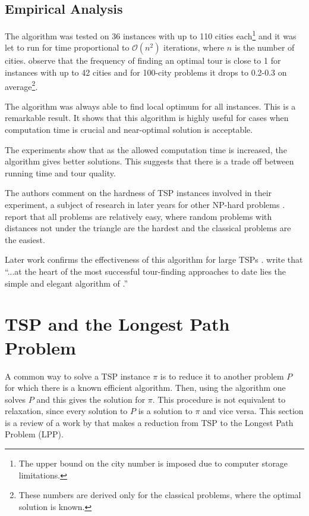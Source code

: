 \documentclass[a4paper,12pt]{article}
\begin{document}
\subsection*{Empirical Analysis}
The algorithm was tested on 36 instances with up to 110 cities each\footnote{The upper bound on the city number is imposed due to computer storage limitations.}
 and it was let to run for time proportional to $\mathcal{O}(n^{2})$ iterations, where $n$ is the number of cities. \citet{LinKernighan73} observe that the frequency of finding an optimal tour is close to 1 for instances with up to 42 cities and for 100-city problems it drops to 0.2-0.3 on average\footnote{These numbers are derived only for the classical problems, where the optimal solution is known.}.

The algorithm was always able to find local optimum for all instances. This is a remarkable result. It shows that this algorithm is highly useful for cases when computation time is crucial and near-optimal solution is acceptable. 

The experiments show that as the allowed computation time is increased, the algorithm gives better solutions. This suggests that there is a trade off between running time and tour quality. 

The authors comment on the hardness of TSP instances involved in their experiment, a subject of research in later years for other NP-hard problems \citep{Cheeseman91, Ciaran16}. \citet{LinKernighan73} report that all problems are relatively easy, where random problems with distances not under the triangle are the hardest and the classical problems are the easiest.

Later work confirms the effectiveness of this algorithm for large TSPs \citep{Applegate03}. \citet{Applegate07} write that ``...at the heart of the most successful tour-finding approaches to date lies the simple and elegant algorithm of \citet{LinKernighan73}.''

\section{TSP and the Longest Path Problem}
\label{sec:tspandlpp}
A common way to solve a TSP instance $\pi$ is to reduce it to another problem $P$ for which there is a known efficient algorithm. Then, using the algorithm one solves $P$ and this gives the solution for $\pi$. This procedure is not equivalent to relaxation, since every solution to $P$ is a solution to $\pi$ and vice versa. This section is a review of a work by \citet{Hardgrave62} that makes a reduction from TSP to the Longest Path Problem (LPP). 
\end{document}
